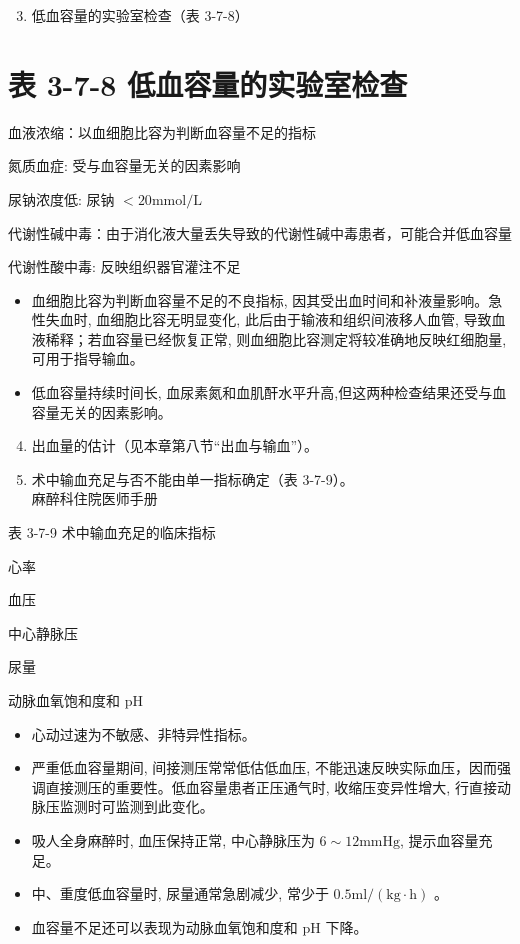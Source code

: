 \documentclass[10pt]{article}
\begin{document}
\begin{enumerate}
  \setcounter{enumi}{2}
  \item 低血容量的实验室检查（表 3-7-8）
\end{enumerate}

\section*{表 3-7-8 低血容量的实验室检查}
血液浓缩：以血细胞比容为判断血容量不足的指标

氮质血症: 受与血容量无关的因素影响

尿钠浓度低: 尿钠 $<20 \mathrm{mmol} / \mathrm{L}$

代谢性碱中毒：由于消化液大量丢失导致的代谢性碱中毒患者，可能合并低血容量

代谢性酸中毒: 反映组织器官灌注不足

\begin{itemize}
  \item 血细胞比容为判断血容量不足的不良指标, 因其受出血时间和补液量影响。急性失血时, 血细胞比容无明显变化, 此后由于输液和组织间液移人血管, 导致血液稀释；若血容量已经恢复正常, 则血细胞比容测定将较准确地反映红细胞量, 可用于指导输血。
  \item 低血容量持续时间长, 血尿素氮和血肌酐水平升高,但这两种检查结果还受与血容量无关的因素影响。
\end{itemize}

\begin{enumerate}
  \setcounter{enumi}{3}
  \item 出血量的估计（见本章第八节“出血与输血”）。

  \item 术中输血充足与否不能由单一指标确定（表 3-7-9）。\\
麻醉科住院医师手册

\end{enumerate}

表 3-7-9 术中输血充足的临床指标

心率

血压

中心静脉压

尿量

动脉血氧饱和度和 $\mathrm{pH}$

\begin{itemize}
  \item 心动过速为不敏感、非特异性指标。
  \item 严重低血容量期间, 间接测压常常低估低血压, 不能迅速反映实际血压，因而强调直接测压的重要性。低血容量患者正压通气时, 收缩压变异性增大, 行直接动脉压监测时可监测到此变化。
  \item 吸人全身麻醉时, 血压保持正常, 中心静脉压为 $6 \sim 12 \mathrm{mmHg}$, 提示血容量充足。
  \item 中、重度低血容量时, 尿量通常急剧减少, 常少于 $0.5 \mathrm{ml} /(\mathrm{kg} \cdot \mathrm{h})$ 。
  \item 血容量不足还可以表现为动脉血氧饱和度和 $\mathrm{pH}$ 下降。
\end{itemize}
\end{document}
